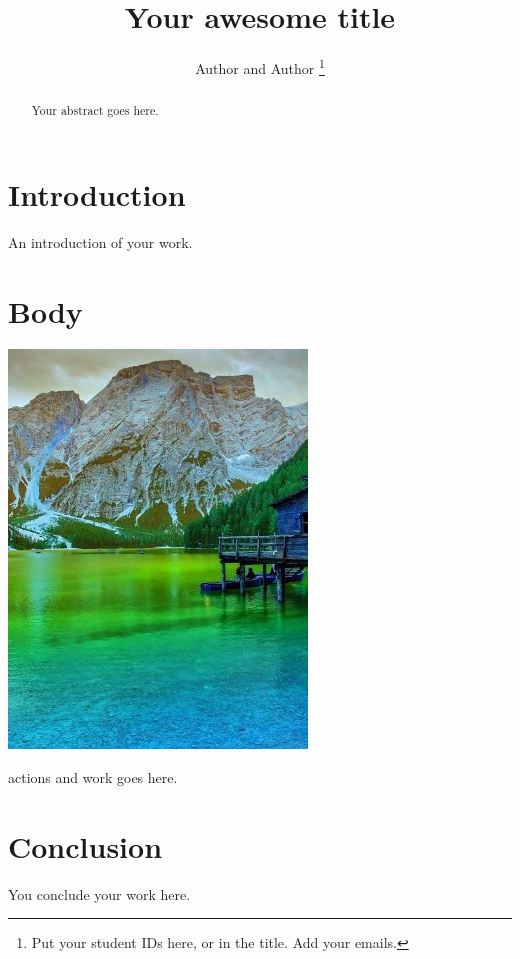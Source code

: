\documentclass[]{IEEEtran}
\begin{document}
  \title{Your awesome title}
  \author{Author and Author
    \thanks{Put your student IDs here, or in the title.  Add your emails.}
  }
  \maketitle
  
  \begin{abstract}
    Your abstract goes here.
  \end{abstract}
  
  \section{Introduction}
  
  An introduction of your work.


  \section{Body}
  
  \includegraphics{../output/o-2-a-0.jpg}

  actions and work goes here.
  
  \section{Conclusion}
  
  You conclude your work here.
  
\end{document}
